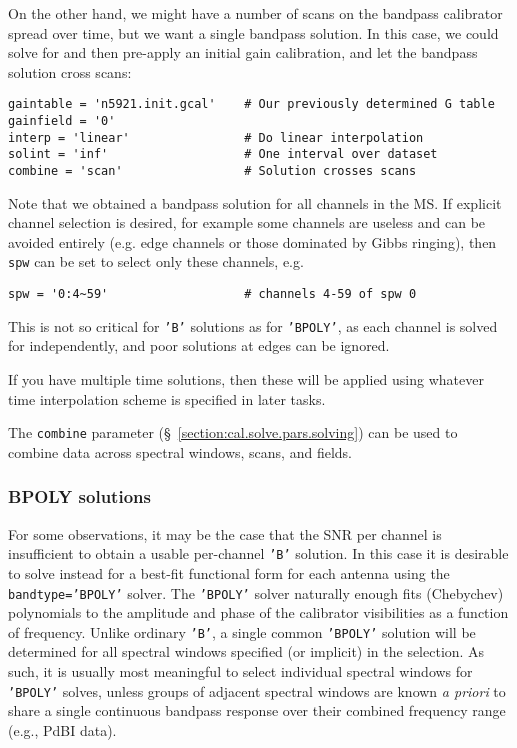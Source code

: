 On the other hand, we might have a number of scans on the bandpass
calibrator spread over time, but we want a single bandpass solution.
In this case, we could solve for and then pre-apply an initial gain
calibration, and let the bandpass solution cross scans:
\small
\begin{verbatim}
gaintable = 'n5921.init.gcal'    # Our previously determined G table
gainfield = '0'
interp = 'linear'                # Do linear interpolation
solint = 'inf'                   # One interval over dataset
combine = 'scan'                 # Solution crosses scans
\end{verbatim}
\normalsize

Note that we obtained a bandpass solution for all channels in the MS.
If explicit channel selection is desired, for example some channels 
are useless and can be avoided entirely (e.g. edge channels or those
dominated by Gibbs ringing), then {\tt spw} can be set to select only
these channels, e.g.
\small
\begin{verbatim}
spw = '0:4~59'                   # channels 4-59 of spw 0
\end{verbatim}
\normalsize
This is not so critical for {\tt 'B'} solutions as for {\tt 'BPOLY'},
as each channel is solved for independently, and poor solutions at
edges can be ignored.

If you have multiple time solutions, then these will be applied using
whatever time interpolation scheme is specified in later tasks. 

The {\tt combine} parameter (\S~\ref{section:cal.solve.pars.solving}) 
can be used to combine data across spectral windows, scans, and fields.

\subsubsection{BPOLY solutions}
\label{section:cal.solve.band.bpoly}

For some observations, it may be the case that the SNR per channel is
insufficient to obtain a usable per-channel {\tt 'B'} solution.  In this
case it is desirable to solve instead for a best-fit functional form
for each antenna using the {\tt bandtype='BPOLY'} solver. 
The {\tt 'BPOLY'} solver naturally enough fits (Chebychev) polynomials to the
amplitude and phase of the calibrator 
visibilities as a function of frequency.  Unlike ordinary {\tt 'B'}, a
single common {\tt 'BPOLY'} solution will be determined for all spectral
windows specified (or implicit) in the selection.  As
such, it is usually most meaningful to select individual spectral
windows for {\tt 'BPOLY'} solves, unless groups of adjacent spectral windows
are known {\it a priori} to share a single continuous bandpass
response over their combined frequency range (e.g., PdBI data).


